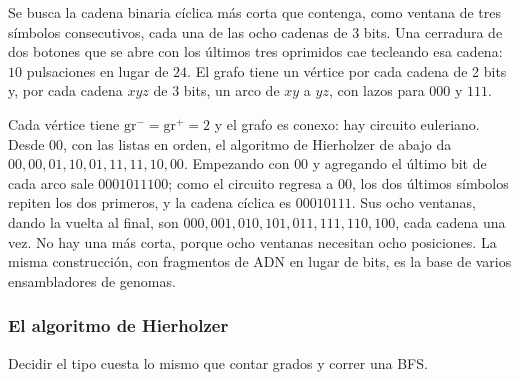 \documentclass[11pt,letterpaper]{article}
\begin{document}
\begin{ejemplo}
  \label{ej:de-bruijn}
  Se busca la cadena binaria cíclica más corta que contenga, como
  ventana de tres símbolos consecutivos, cada una de las ocho cadenas
  de 3 bits. Una cerradura de dos botones que se abre con los últimos
  tres oprimidos cae tecleando esa cadena: $10$ pulsaciones en lugar
  de $24$. El grafo tiene un vértice por
  cada cadena de 2 bits y, por cada cadena $xyz$ de 3 bits, un arco de
  $xy$ a $yz$, con lazos para $000$ y $111$.
  \begin{center}
  \end{center}
  Cada vértice tiene $\text{gr}^{-} = \text{gr}^{+} = 2$ y el grafo es
  conexo: hay circuito euleriano. Desde $00$, con las listas en orden,
  el algoritmo de Hierholzer de abajo da
  $00, 00, 01, 10, 01, 11, 11, 10, 00$. Empezando con $00$ y agregando
  el último bit de cada arco sale $0001011100$; como el circuito
  regresa a $00$, los dos últimos símbolos repiten los dos primeros, y
  la cadena cíclica es $00010111$. Sus ocho ventanas, dando la vuelta
  al final, son $000, 001, 010, 101, 011, 111, 110, 100$, cada cadena
  una vez. No hay una más corta, porque ocho ventanas necesitan ocho
  posiciones. La misma construcción, con fragmentos de ADN en lugar de
  bits, es la base de varios ensambladores de genomas.
\end{ejemplo}

\subsubsection*{El algoritmo de Hierholzer}

Decidir el tipo cuesta lo mismo que contar grados y correr una BFS.
\end{document}
